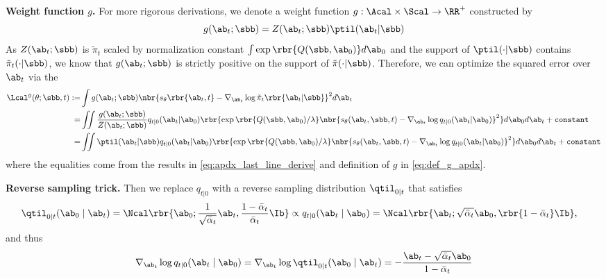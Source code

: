 \textbf{Weight function $g$.} For more rigorous derivations, we denote a weight function $g:\Acal\times\Scal\to \RR^+$ constructed by 
\begin{equation}
    g(\ab_t;\sbb) = Z(\ab_t;\sbb)\ptil(\ab_t|\sbb) \label{eq:def_g_apdx}
\end{equation}
As $Z(\ab_t;\sbb)$ is $\tilde\pi_t$ scaled by normalization constant $\int\exp\rbr{Q(\sbb,\ab_0)}d\ab_0$ and the support of $\ptil(\cdot|\sbb)$ contains $\tilde\pi_t(\cdot|\sbb)$, we know that $g(\ab_t;\sbb)$ is strictly positive on the support of $\tilde\pi(\cdot|\sbb)$. Therefore, we can optimize the squared error over $\ab_t$ via the 
\begin{align}
    \Lcal^g(\theta;\sbb,t)  :=& \int g(\ab_t;\sbb)\nbr{s_\theta\rbr{\ab_t,t} - \nabla_{\ab_t} \log \tilde\pi_t\rbr{\ab_t|\sbb}}^2d\ab_t\notag\\
    =& \iint\frac{g(\ab_t;\sbb) }{Z(\ab_t;\sbb)}q_{t|0}(\ab_t|\ab_0)\rbr{{\exp\rbr{Q(\sbb,\ab_0)/\lambda}}\nbr{s_\theta(\ab_t,\sbb, t) - \nabla_{\ab_t}\log q_{t|0}(\ab_t|\ab_0)}^2  } d\ab_0d\ab_t + \texttt{constant}\notag\\
     =& \iint\ptil(\ab_t|\sbb)q_{t|0}(\ab_t|\ab_0)\rbr{{\exp\rbr{Q(\sbb,\ab_0)/\lambda}}\nbr{s_\theta(\ab_t,\sbb, t) - \nabla_{\ab_t}\log q_{t|0}(\ab_t|\ab_0)}^2  } d\ab_0d\ab_t + \texttt{constant} \label{eq:before_reverse_sample_apdx}
\end{align}
where the equalities come from the results in \eqref{eq:apdx_last_line_derive} and definition of $g$ in \eqref{eq:def_g_apdx}.

\textbf{Reverse sampling trick.} Then we replace $q_{t|0}$ with a reverse sampling distribution $\qtil_{0|t}$ that satisfies
    \begin{equation}
        \begin{aligned}
        &\qtil_{0|t}(\ab_0\mid \ab_t) =\Ncal\rbr{\ab_0;\frac{1}{\sqrt{\bar\alpha_t}}\ab_t, \frac{1 - \bar\alpha_t}{\bar\alpha_t}\Ib}
        \propto q_{t|0}(\ab_t\mid \ab_0) = \Ncal\rbr{\ab_t;\sqrt{\bar\alpha_t}\ab_0, \rbr{1 - \bar\alpha_t}\Ib},  \end{aligned}\label{eq:reverse_gaussian_apdx}
    \end{equation}
    and thus
    \begin{equation}
        \nabla_{\ab_t}\log q_{t|0}(\ab_t\mid \ab_0) = \nabla_{\ab_t}\log \qtil_{0|t}(\ab_0\mid \ab_t) = - \frac{\ab_t -\sqrt{\bar\alpha_t}\ab_0}{1 -\bar\alpha_t}\label{eq:reverse_sampling_score_apdx}
    \end{equation}

